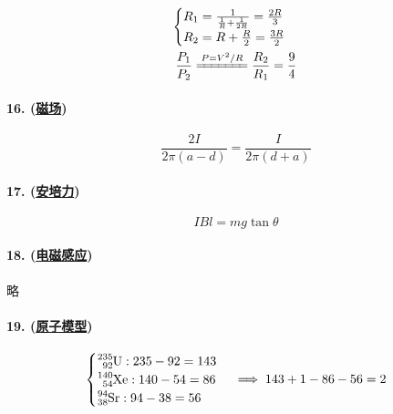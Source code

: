 \begin{gather*}
    \begin{cases}
        R_1=\frac{1}{\frac{1}{R}+\frac{1}{2R}}=\frac{2R}{3}\\
        R_2=R+\frac{R}{2}=\frac{3R}{2}
    \end{cases}\\
    \frac{P_1}{P_2}\xlongequal{P=V^2/R}\frac{R_2}{R_1}=\frac94
\end{gather*}

\paragraph{16. (\hyperref[subsec:磁场]{磁场})}

\begin{equation*}
    \frac{2I}{2\pi(a-d)}=\frac{I}{2\pi(d+a)}
\end{equation*}

\paragraph{17. (\hyperref[subsec:安培力]{安培力})}

\begin{equation*}
    IBl=mg\tan\theta
\end{equation*}

\paragraph{18. (\hyperref[subsec:电磁感应]{电磁感应})} 略
\paragraph{19. (\hyperref[sec:原子模型]{原子模型})}

\begin{equation*}
    \begin{cases}
        \ce{^{235}_{92}U}:235-92=143\\
        \ce{^{140}_{54}Xe}:140-54=86\\
        \ce{^{94}_{38}Sr}:94-38=56
    \end{cases}\implies 143+1-86-56=2
\end{equation*}

